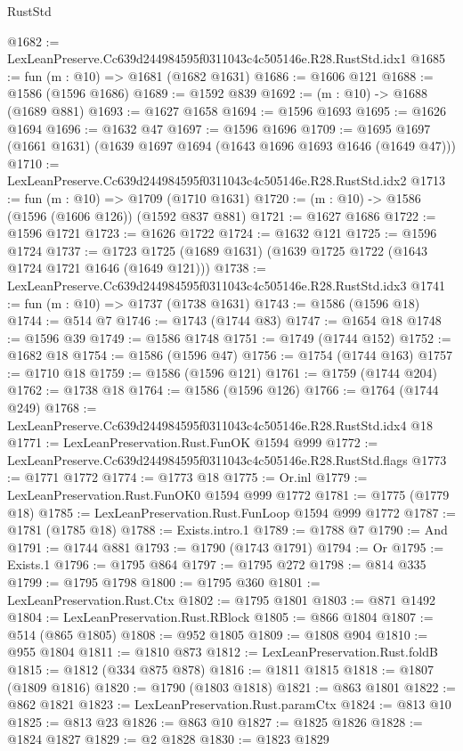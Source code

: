 \begin{lexlean}{RustStd}
\begin{coremodule}
@1682 := LexLeanPreserve.Cc639d244984595f0311043c4c505146e.R28.RustStd.idx1
@1685 := fun (m : @10) => @1681 (@1682 @1631)
@1686 := @1606 @121
@1688 := @1586 (@1596 @1686)
@1689 := @1592 @839
@1692 := (m : @10) -> @1688 (@1689 @881)
@1693 := @1627 @1658
@1694 := @1596 @1693
@1695 := @1626 @1694
@1696 := @1632 @47
@1697 := @1596 @1696
@1709 := @1695 @1697 (@1661 @1631) (@1639 @1697 @1694 (@1643 @1696 @1693 @1646 (@1649 @47)))
@1710 := LexLeanPreserve.Cc639d244984595f0311043c4c505146e.R28.RustStd.idx2
@1713 := fun (m : @10) => @1709 (@1710 @1631)
@1720 := (m : @10) -> @1586 (@1596 (@1606 @126)) (@1592 @837 @881)
@1721 := @1627 @1686
@1722 := @1596 @1721
@1723 := @1626 @1722
@1724 := @1632 @121
@1725 := @1596 @1724
@1737 := @1723 @1725 (@1689 @1631) (@1639 @1725 @1722 (@1643 @1724 @1721 @1646 (@1649 @121)))
@1738 := LexLeanPreserve.Cc639d244984595f0311043c4c505146e.R28.RustStd.idx3
@1741 := fun (m : @10) => @1737 (@1738 @1631)
@1743 := @1586 (@1596 @18)
@1744 := @514 @7
@1746 := @1743 (@1744 @83)
@1747 := @1654 @18
@1748 := @1596 @39
@1749 := @1586 @1748
@1751 := @1749 (@1744 @152)
@1752 := @1682 @18
@1754 := @1586 (@1596 @47)
@1756 := @1754 (@1744 @163)
@1757 := @1710 @18
@1759 := @1586 (@1596 @121)
@1761 := @1759 (@1744 @204)
@1762 := @1738 @18
@1764 := @1586 (@1596 @126)
@1766 := @1764 (@1744 @249)
@1768 := LexLeanPreserve.Cc639d244984595f0311043c4c505146e.R28.RustStd.idx4 @18
@1771 := LexLeanPreservation.Rust.FunOK @1594 @999
@1772 := LexLeanPreserve.Cc639d244984595f0311043c4c505146e.R28.RustStd.flags
@1773 := @1771 @1772
@1774 := @1773 @18
@1775 := Or.inl
@1779 := LexLeanPreservation.Rust.FunOK0 @1594 @999 @1772
@1781 := @1775 (@1779 @18)
@1785 := LexLeanPreservation.Rust.FunLoop @1594 @999 @1772
@1787 := @1781 (@1785 @18)
@1788 := Exists.intro.{1}
@1789 := @1788 @7
@1790 := And
@1791 := @1744 @881
@1793 := @1790 (@1743 @1791)
@1794 := Or
@1795 := Exists.{1}
@1796 := @1795 @864
@1797 := @1795 @272
@1798 := @814 @335
@1799 := @1795 @1798
@1800 := @1795 @360
@1801 := LexLeanPreservation.Rust.Ctx
@1802 := @1795 @1801
@1803 := @871 @1492
@1804 := LexLeanPreservation.Rust.RBlock
@1805 := @866 @1804
@1807 := @514 (@865 @1805)
@1808 := @952 @1805
@1809 := @1808 @904
@1810 := @955 @1804
@1811 := @1810 @873
@1812 := LexLeanPreservation.Rust.foldB
@1815 := @1812 (@334 @875 @878)
@1816 := @1811 @1815
@1818 := @1807 (@1809 @1816)
@1820 := @1790 (@1803 @1818)
@1821 := @863 @1801
@1822 := @862 @1821
@1823 := LexLeanPreservation.Rust.paramCtx
@1824 := @813 @10
@1825 := @813 @23
@1826 := @863 @10
@1827 := @1825 @1826
@1828 := @1824 @1827
@1829 := @2 @1828
@1830 := @1823 @1829

\end{coremodule}
\end{lexlean}
